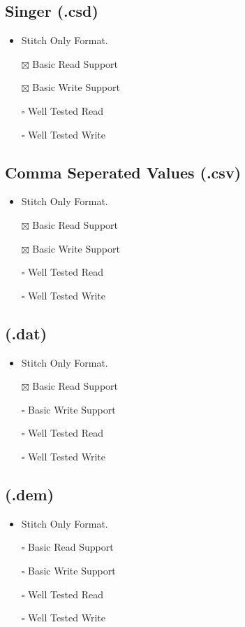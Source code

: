 \documentclass[onesize, a4paper]{refart}
\providecommand{\tightlist}{\setlength{\itemsep}{0pt}\setlength{\parskip}{0pt}}
\begin{document}
\subsection{Singer (.csd)}

\begin{itemize}
\tightlist
\item Stitch Only Format.
\item[$\boxtimes$] Basic Read Support
\item[$\boxtimes$] Basic Write Support
\item[$\square$] Well Tested Read
\item[$\square$] Well Tested Write
\end{itemize}

\subsection{Comma Seperated Values (.csv)}

\begin{itemize}
\tightlist
\item Stitch Only Format.
\item[$\boxtimes$] Basic Read Support
\item[$\boxtimes$] Basic Write Support
\item[$\square$] Well Tested Read
\item[$\square$] Well Tested Write
\end{itemize}

\subsection{(.dat)}

\begin{itemize}
\tightlist
\item
  Stitch Only Format.
\item[$\boxtimes$]
  Basic Read Support
\item[$\square$]
  Basic Write Support
\item[$\square$]
  Well Tested Read
\item[$\square$]
  Well Tested Write
\end{itemize}

\hypertarget{dem}{%
\subsection{(.dem)}\label{dem}}

\begin{itemize}
\tightlist
\item
  Stitch Only Format.
\item[$\square$]
  Basic Read Support
\item[$\square$]
  Basic Write Support
\item[$\square$]
  Well Tested Read
\item[$\square$]
  Well Tested Write
\end{itemize}
\end{document}
